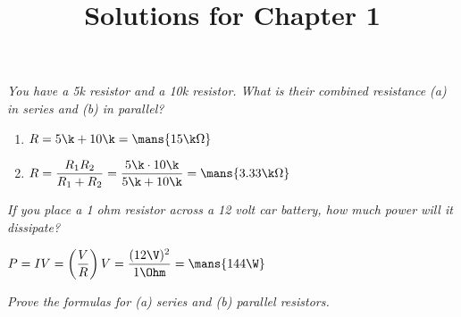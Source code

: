 \documentclass{article}
\begin{document}
\title{Solutions for Chapter 1}
    \textit{You have a 5k resistor and a 10k resistor. What is their combined resistance (a) in series and (b) in parallel?}

    \begin{enumerate}
        \item 
        $R = 5\k + 10\k = \mans{15\k\Omega}$

        \item 
        $R = \dfrac{R_1 R_2}{R_1 + R_2} = \dfrac{5\k \cdot 10\k}{5\k + 10\k} = \mans{3.33\k\Omega}$

    \end{enumerate}

    \textit{If you place a 1 ohm resistor across a 12 volt car battery, how much power will it dissipate?}
    \bigskip

    $P = IV = \left(\dfrac{V}{R}\right)V = \dfrac{(12\V)^2}{1\Ohm} = \mans{144\W}$

    \textit{Prove the formulas for (a) series and (b) parallel resistors.}
\end{document}
